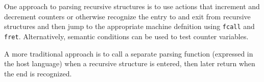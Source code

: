 \documentclass[letterpaper,11pt,oneside]{book}
\begin{document}
One approach to parsing recursive structures is to use actions that increment
and decrement counters or otherwise recognize the entry to and exit from
recursive structures and then jump to the appropriate machine defnition using
\verb|fcall| and \verb|fret|. Alternatively, semantic conditions can be used to
test counter variables.

A more traditional approach is to call a separate parsing function (expressed
in the host language) when a recursive structure is entered, then later return
when the end is recognized.
\end{document}
